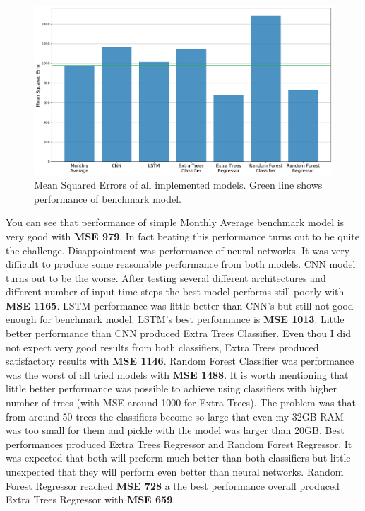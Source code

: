 \documentclass{article}
\begin{document}
\begin{figure}[h!]
\centering
\includegraphics[width=16cm]{imgs/performance.png}
\caption{Mean Squared Errors of all implemented models. Green line shows performance of benchmark model.}
\label{fig:all_models_result}
\end{figure}

You can see that performance of simple Monthly Average benchmark model is very good with \textbf{MSE 979}. In fact beating this performance turns out to be quite the challenge. Disappointment was performance of neural networks. It was very difficult to produce some reasonable performance from both models. CNN model turns out to be the worse. After testing several different architectures and different number of input time steps the best model performs still poorly with \textbf{MSE 1165}. LSTM performance was little better than CNN's but still not good enough for benchmark model. LSTM's best performance is \textbf{MSE 1013}. Little better performance than CNN produced Extra Trees Classifier. Even thou I did not expect very good results from both classifiers, Extra Trees produced satisfactory results with \textbf{MSE 1146}. Random Forest Classifier was performance was the worst of all tried models with \textbf{MSE 1488}. It is worth mentioning that little better performance was possible to achieve using classifiers with higher number of trees (with MSE around 1000 for Extra Trees). The problem was that from around 50 trees the classifiers become so large that even my 32GB RAM was too small for them and pickle with the model was larger than 20GB. Best performances produced Extra Trees Regressor and Random Forest Regressor. It was expected that both will preform much better than both classifiers but little unexpected that they will perform even better than neural networks. Random Forest Regressor reached \textbf{MSE 728} a the best performance overall produced Extra Trees Regressor with \textbf{MSE 659}.
\end{document}
